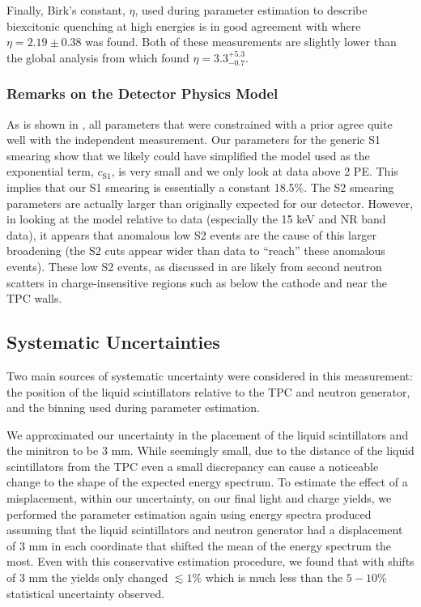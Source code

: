 Finally, Birk's constant, $\eta$, used during parameter estimation to describe biexcitonic quenching at high energies is in good agreement with  where $\eta = 2.19 \pm 0.38$ was found.  Both of these measurements are slightly lower than the global analysis from  which found $\eta = 3.3^{+5.3}_{-0.7}$.


\subsubsection{Remarks on the Detector Physics Model}

As is shown in , all parameters that were constrained with a prior agree quite well with the independent measurement.  Our parameters for the generic S1 smearing show that we likely could have simplified the model used as the exponential term, $c_{\textrm{S1}}$, is very small and we only look at data above 2 PE.  This implies that our S1 smearing is essentially a constant 18.5\%.  The S2 smearing parameters are actually larger than originally expected for our detector.  However, in looking at the model relative to data (especially the 15 keV and NR band data), it appears that anomalous low S2 events are the cause of this larger broadening (the S2 cuts appear wider than data to ``reach'' these anomalous events).  These low S2 events, as discussed in  are likely from second neutron scatters in charge-insensitive regions such as below the cathode and near the TPC walls.


\subsection{Systematic Uncertainties}


Two main sources of systematic uncertainty were considered in this measurement: the position of the liquid scintillators relative to the TPC and neutron generator, and the binning used during parameter estimation.  

We approximated our uncertainty in the placement of the liquid scintillators and the minitron to be 3 mm.  While seemingly small, due to the distance of the liquid scintillators from the TPC even a small discrepancy can cause a noticeable change to the shape of the expected energy spectrum.  To estimate the effect of a misplacement, within our uncertainty, on our final light and charge yields, we performed the parameter estimation again using energy spectra produced assuming that the liquid scintillators and neutron generator had a displacement of 3 mm in each coordinate that shifted the mean of the energy spectrum the most.  Even with this conservative estimation procedure, we found that with shifts of 3 mm the yields only changed $\lesssim 1\%$ which is much less than the $5-10\%$ statistical uncertainty observed.

